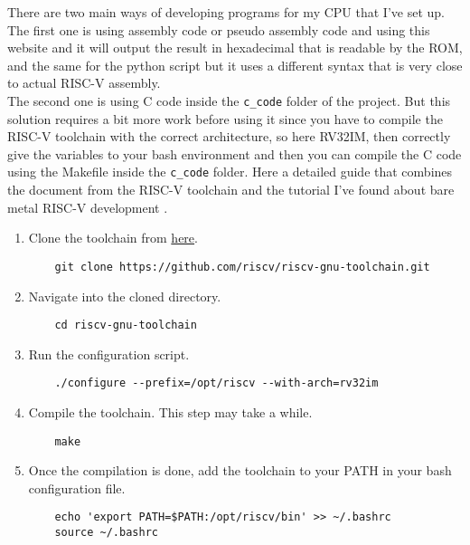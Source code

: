 There are two main ways of developing programs for my CPU that I've set up.\\

The first one is using assembly code or pseudo assembly code and using this website\cite{riscv_online_assembler} and it will output 
the result in hexadecimal that is readable by the ROM, and the same for the python script\cite{riscv_python_assembler} but it uses a 
different syntax that is very close to actual RISC-V assembly.\\

The second one is using C code inside the \texttt{c\_code} folder of the project. But this solution requires a bit more work before 
using it since you have to compile the RISC-V toolchain with the correct architecture, so here RV32IM, then correctly give the variables 
to your bash environment and then you can compile the C code using the Makefile inside the \texttt{c\_code} folder. Here a detailed guide 
that combines the document from the RISC-V toolchain\cite{riscv_gnu_toolchain} and the tutorial I've found about bare metal RISC-V development
\cite{riscv_gnu_toolchain_baremetal_tutorials}.

\begin{enumerate}[label={\textbullet}]
    \item Clone the toolchain from \href{https://github.com/riscv-collab/riscv-gnu-toolchain}{here}.
    
    \begin{verbatim}
    git clone https://github.com/riscv/riscv-gnu-toolchain.git
    \end{verbatim}
    
    \item Navigate into the cloned directory.
    
    \begin{verbatim}
    cd riscv-gnu-toolchain
    \end{verbatim}
    
    \item Run the configuration script.

    \begin{verbatim}
    ./configure --prefix=/opt/riscv --with-arch=rv32im
    \end{verbatim}
    
    \item Compile the toolchain. This step may take a while.
    
    \begin{verbatim}
    make
    \end{verbatim}
    
    \item Once the compilation is done, add the toolchain to your PATH in your bash configuration file.

    \begin{verbatim}
    echo 'export PATH=$PATH:/opt/riscv/bin' >> ~/.bashrc
    source ~/.bashrc
    \end{verbatim}
\end{enumerate}

